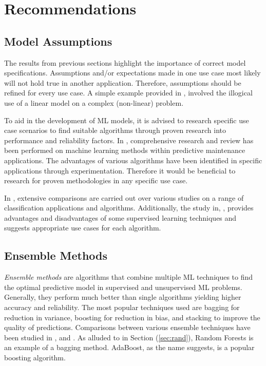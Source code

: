 \section{Recommendations}
\subsection{Model Assumptions}
The results from previous sections highlight the importance of correct model specifications. 
Assumptions and/or expectations made in one use case most likely will not hold true in another application.
Therefore, assumptions should be refined for every use case.
A simple example provided in \cite{saria2019tutorial}, involved the illogical use of a linear model on a complex (non-linear) problem.

To aid in the development of ML models, it is advised to research specific use case scenarios to find suitable algorithms through proven research into performance and reliability factors.
In \cite{pdm_review}, comprehensive research and review has been performed on machine learning methods within predictive maintenance applications.
The advantages of various algorithms have been identified in specific applications through experimentation. 
Therefore it would be beneficial to research for proven methodologies in any specific use case.  

In \cite{10.1016/j.eswa.2017.04.003}, extensive comparisons are carried out over various studies on a range of classification applications and algorithms.
Additionally, the study in, \cite{7724478}, provides advantages and disadvantages of some supervised learning techniques and suggests appropriate use cases for each algorithm.

\subsection{Ensemble Methods}
\textit{Ensemble methods} are algorithms that combine multiple ML techniques to find the optimal predictive model in supervised and unsupervised ML problems.
Generally, they perform much better than single algorithms yielding higher accuracy and reliability.
The most popular techniques used are bagging for reduction in variance, boosting for reduction in bias, and stacking to improve the quality of predictions.
Comparisons between various ensemble techniques have been studied in \cite{7340924}, \cite{8389056} and \cite{1358033}.
As alluded to in Section (\ref{sec:rand}), Random Forests is an example of a bagging method. AdaBoost, as the name suggests, is a popular boosting algorithm.

